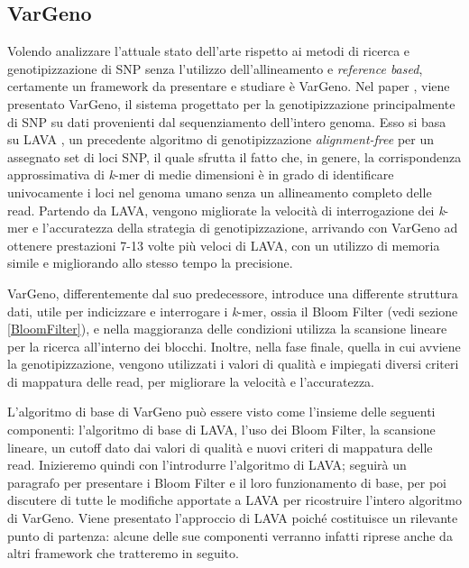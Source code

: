 \documentclass[../main.tex]{subfiles}
\begin{document}
\subsection{VarGeno}
\label{vargeno}
Volendo analizzare l'attuale stato dell'arte rispetto ai metodi di ricerca e genotipizzazione di SNP senza l'utilizzo dell'allineamento e \textit{reference based}, certamente un framework da presentare e studiare è VarGeno. Nel paper \cite{sun-medvedev2018vargeno}, viene presentato VarGeno, il sistema progettato per la genotipizzazione principalmente di SNP su dati provenienti dal sequenziamento dell'intero genoma. Esso si basa su LAVA \cite{shajii2016lava}, un precedente algoritmo di genotipizzazione \textit{alignment-free} per un assegnato set di loci SNP, il quale sfrutta il fatto che, in genere, la corrispondenza approssimativa di \textit{k}-mer di medie dimensioni è in grado di identificare univocamente i loci nel genoma umano senza un allineamento completo delle read. Partendo da LAVA, vengono migliorate la velocità di interrogazione dei \textit{k}-mer e l'accuratezza della strategia di genotipizzazione, arrivando con VarGeno ad ottenere prestazioni 7-13 volte più veloci di LAVA, con un utilizzo di memoria simile e migliorando allo stesso tempo la precisione.

VarGeno, differentemente dal suo predecessore, introduce una differente struttura dati, utile per indicizzare e interrogare i \textit{k}-mer, ossia il Bloom Filter (vedi sezione \ref{BloomFilter}), e nella maggioranza delle condizioni utilizza la scansione lineare per la ricerca all'interno dei blocchi. Inoltre, nella fase finale, quella in cui avviene la genotipizzazione, vengono utilizzati i valori di qualità e impiegati diversi criteri di mappatura delle read, per migliorare la velocità e l'accuratezza. 

L'algoritmo di base di VarGeno può essere visto come l'insieme delle seguenti componenti: l'algoritmo di base di LAVA, l'uso dei Bloom Filter, la scansione lineare, un cutoff dato dai valori di qualità e nuovi criteri di mappatura delle read. Inizieremo quindi con l'introdurre l'algoritmo di LAVA; seguirà un paragrafo per presentare i Bloom Filter e il loro funzionamento di base, per poi discutere di tutte le modifiche apportate a LAVA per ricostruire l'intero algoritmo di VarGeno. Viene presentato l'approccio di LAVA poiché costituisce un rilevante punto di partenza: alcune delle sue componenti verranno infatti riprese anche da altri framework che tratteremo in seguito.
\end{document}
